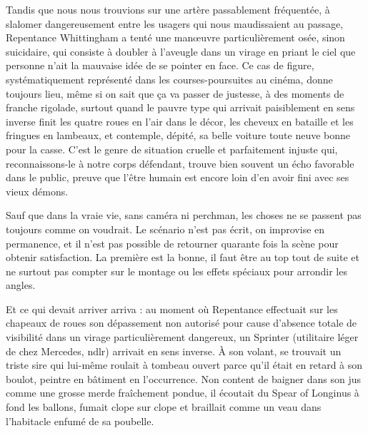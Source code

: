 Tandis que nous nous trouvions sur une artère passablement fréquentée, à slalomer dangereusement entre les usagers qui nous maudissaient au passage, Repentance Whittingham a tenté une manœuvre particulièrement osée, sinon suicidaire, qui consiste à doubler à l’aveugle dans un virage en priant le ciel que personne n’ait la mauvaise idée de se pointer en face. Ce cas de figure, systématiquement représenté dans les courses-poursuites au cinéma, donne toujours lieu, même si on sait que ça va passer de justesse, à des moments de franche rigolade, surtout quand le pauvre type qui arrivait paisiblement en sens inverse finit les quatre roues en l’air dans le décor, les cheveux en bataille et les fringues en lambeaux, et contemple, dépité, sa belle voiture toute neuve bonne pour la casse. C’est le genre de situation cruelle et parfaitement injuste qui, reconnaissons-le à notre corps défendant, trouve bien souvent un écho favorable dans le public, preuve que l’être humain est encore loin d’en avoir fini avec ses vieux démons.

Sauf que dans la vraie vie, sans caméra ni perchman, les choses ne se passent pas toujours comme on voudrait. Le scénario n’est pas écrit, on improvise en permanence, et il n’est pas possible de retourner quarante fois la scène pour obtenir satisfaction. La première est la bonne, il faut être au top tout de suite et ne surtout pas compter sur le montage ou les effets spéciaux pour arrondir les angles.

Et ce qui devait arriver arriva : au moment où Repentance effectuait sur les chapeaux de roues son dépassement non autorisé pour cause d’absence totale de visibilité dans un virage particulièrement dangereux, un Sprinter (utilitaire léger de chez Mercedes, ndlr) arrivait en sens inverse. À son volant, se trouvait un triste sire qui lui-même roulait à tombeau ouvert parce qu’il était en retard à son boulot, peintre en bâtiment en l’occurrence. Non content de baigner dans son jus comme une grosse merde fraîchement pondue, il écoutait du Spear of Longinus à fond les ballons, fumait clope sur clope et braillait comme un veau dans l’habitacle enfumé de sa poubelle.

